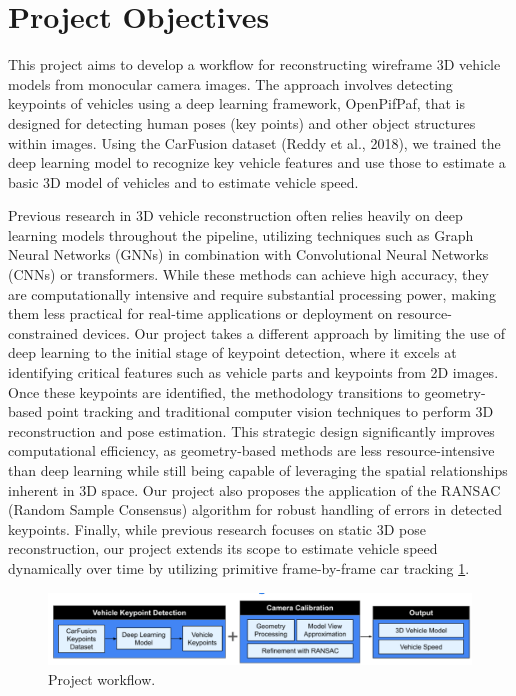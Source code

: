 \documentclass[conference]{IEEEtran}
\begin{document}
\section{Project Objectives}

This project aims to develop a workflow for reconstructing wireframe 3D vehicle models from monocular camera images. The approach involves detecting keypoints of vehicles using a deep learning framework, OpenPifPaf, that is designed for detecting human poses (key points) and other object structures within images. Using the CarFusion dataset (Reddy et al., 2018), we trained the deep learning model to recognize key vehicle features and use those to estimate a basic 3D model of vehicles and to estimate vehicle speed.

Previous research in 3D vehicle reconstruction often relies heavily on deep learning models throughout the pipeline, utilizing techniques such as Graph Neural Networks (GNNs) in combination with Convolutional Neural Networks (CNNs) or transformers. While these methods can achieve high accuracy, they are computationally intensive and require substantial processing power, making them less practical for real-time applications or deployment on resource-constrained devices. Our project takes a different approach by limiting the use of deep learning to the initial stage of keypoint detection, where it excels at identifying critical features such as vehicle parts and keypoints from 2D images. Once these keypoints are identified, the methodology transitions to geometry-based point tracking and traditional computer vision techniques to perform 3D reconstruction and pose estimation. This strategic design significantly improves computational efficiency, as geometry-based methods are less resource-intensive than deep learning while still being capable of leveraging the spatial relationships inherent in 3D space. Our project also proposes the application of the RANSAC (Random Sample Consensus) algorithm for robust handling of errors in detected keypoints. Finally, while previous research focuses on static 3D pose reconstruction, our project extends its scope to estimate vehicle speed dynamically over time by utilizing primitive frame-by-frame car tracking
\ref{img:workflow}.

\begin{figure}
    \centering
    \includegraphics[width=0.9\columnwidth]{./images/workflow.png}
    \caption{Project workflow.}
    \label{img:workflow}
\end{figure}
\end{document}
